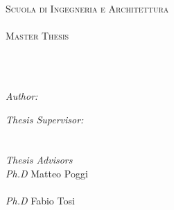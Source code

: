 \documentclass[
11pt, %
english, %
onehalfspacing, %
headsepline, %
]{MastersDoctoralThesis} %
\author{Ali Alessio Salman} %
\begin{document}
\frontmatter %

\pagestyle{plain} %


\begin{titlepage}
\begin{center}

\vspace*{.06\textheight}
{\scshape\LARGE \univname\par}\vspace{1.5cm} %
\textsc{Scuola di Ingegneria e Architettura \\ \textit{\subjectname} \\[2\baselineskip] \Large Master Thesis }\\[0.5cm] %

\HRule \\[0.4cm] %
{\huge \bfseries \ttitle\par}\vspace{0.4cm} %
\HRule \\[1.5cm] %

\begin{minipage}[t]{0.4\textwidth}
\begin{flushleft} \large
\emph{Author:}\\
{\authorname} %
\end{flushleft}
\end{minipage}
\begin{minipage}[t]{0.4\textwidth}
\begin{flushright} \large
\emph{Thesis Supervisor:} \\
{\supname} \\%
\emph{\\Thesis Advisors}\\
\emph{Ph.D} Matteo Poggi\\ \\
\emph{Ph.D} Fabio Tosi


\end{flushright}
\end{minipage}\\[2cm]


\end{center}
\end{titlepage}
\end{document}

